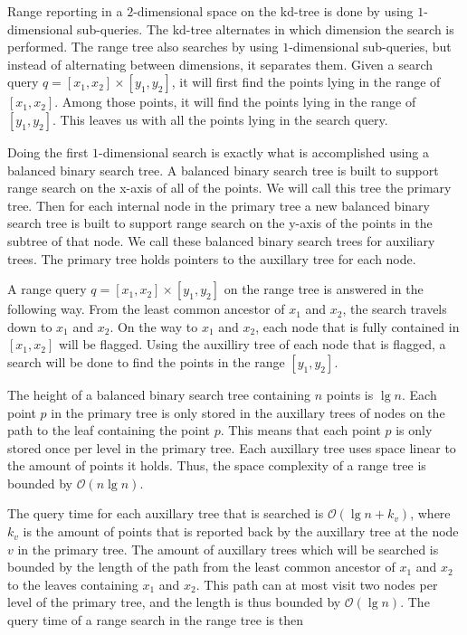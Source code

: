 Range reporting in a $2$-dimensional space on the kd-tree is done by using $1$-dimensional sub-queries. The kd-tree alternates in which dimension the search is performed. The range tree also searches by using $1$-dimensional sub-queries, but instead of alternating between dimensions, it separates them. Given a search query $q = [x_1, x_2] \times [y_1, y_2]$, it will first find the points lying in the range of $[x_1, x_2]$. Among those points, it will find the points lying in the range of $[y_1, y_2]$. This leaves us with all the points lying in the search query.

Doing the first $1$-dimensional search is exactly what is accomplished using a balanced binary search tree. A balanced binary search tree is built to support range search on the x-axis of all of the points. We will call this tree the primary tree. Then for each internal node in the primary tree a new balanced binary search tree is built to support range search on the y-axis of the points in the subtree of that node. We call these balanced binary search trees for auxiliary trees. The primary tree holds pointers to the auxillary tree for each node.

A range query $q = [x_1, x_2] \times [y_1, y_2]$ on the range tree is answered in the following way. From the least common ancestor of $x_1$ and $x_2$, the search travels down to $x_1$ and $x_2$. On the way to $x_1$ and $x_2$, each node that is fully contained in $[x_1, x_2]$ will be flagged. Using the auxilliry tree of each node that is flagged, a search will be done to find the points in the range $[y_1, y_2]$.

The height of a balanced binary search tree containing $n$ points is $\lg n$. Each point $p$ in the primary tree is only stored in the auxillary trees of nodes on the path to the leaf containing the point $p$. This means that each point $p$ is only stored once per level in the primary tree. Each auxillary tree uses space linear to the amount of points it holds. Thus, the space complexity of a range tree is bounded by $\mathcal{O}(n \lg n)$.

The query time for each auxillary tree that is searched is $\mathcal{O}(\lg n + k_v)$, where $k_v$ is the amount of points that is reported back by the auxillary tree at the node $v$ in the primary tree. The amount of auxillary trees which will be searched is bounded by the length of the path from the least common ancestor of $x_1$ and $x_2$ to the leaves containing $x_1$ and $x_2$. This path can at most visit two nodes per level of the primary tree, and the length is thus bounded by $\mathcal{O}(\lg n)$. The query time of a range search in the range tree is then 


